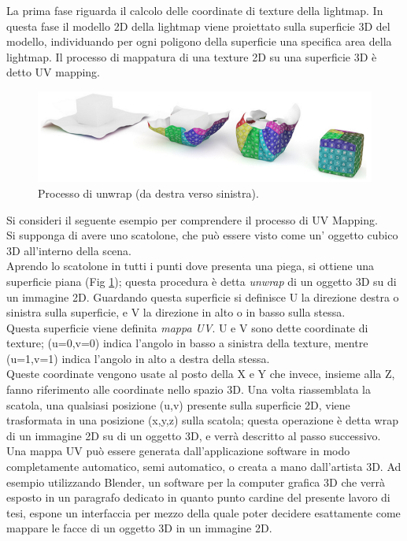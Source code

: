 La prima fase riguarda il calcolo delle coordinate di texture della lightmap.
In questa fase il modello 2D della lightmap viene proiettato sulla superficie 3D del modello, individuando per ogni poligono della superficie una specifica area della lightmap.
Il processo di mappatura di una texture 2D su una superficie 3D è detto UV mapping.
\newpage
\begin{figure}[htb]
 \centering
 \includegraphics[width=0.9\linewidth]{images/chapter_stato_arte/stato_arte_unwrap.png}\hfill
 \caption[Mappatura delle coordinate UV]{Processo di unwrap (da destra verso sinistra).}
 \label{fig:stato_arte_unwrap}
\end{figure}
Si consideri il seguente esempio per comprendere il processo di UV Mapping.
\\
Si supponga di avere uno scatolone, che può essere visto come un’ oggetto cubico 3D all’interno della scena. 
\\
Aprendo lo scatolone in tutti i punti dove presenta una piega, si ottiene una superficie piana (Fig \ref{fig:stato_arte_unwrap}); questa procedura è detta \emph{unwrap} di un oggetto 3D su di un immagine 2D. Guardando questa superficie si definisce U la direzione destra o sinistra sulla superficie, e V la direzione in alto o in basso sulla stessa. 
\\
Questa superficie viene definita \emph{mappa UV}. U e V sono dette coordinate di texture; (u=0,v=0) indica l’angolo in basso a sinistra della texture, mentre (u=1,v=1) indica l’angolo in alto a destra della stessa. 
\\
Queste coordinate vengono usate al posto della X e Y che invece, insieme alla Z, fanno riferimento alle coordinate nello spazio 3D. Una volta riassemblata la scatola, una qualsiasi posizione (u,v) presente sulla superficie 2D, viene trasformata in una posizione (x,y,z) sulla scatola; questa operazione è detta wrap di un immagine 2D su di un oggetto 3D, e verrà descritto al passo successivo.
\\
Una mappa UV può essere generata dall’applicazione software in modo completamente automatico, semi automatico, o creata a mano dall’artista 3D. Ad esempio utilizzando Blender, 
un software per la computer grafica 3D che verrà esposto in un paragrafo dedicato in quanto punto cardine del presente lavoro di tesi, espone un interfaccia per mezzo della quale poter decidere esattamente come mappare le facce di un oggetto 3D in un immagine 2D. 
